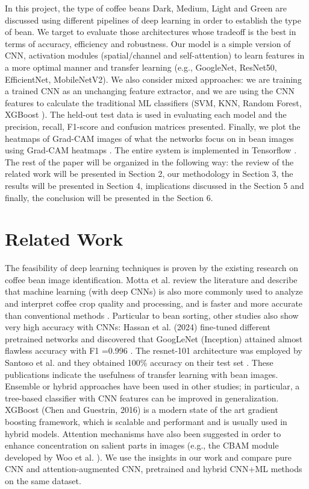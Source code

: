 \documentclass[conference]{IEEEtran}
\begin{document}
In this project, the type of coffee beans Dark, Medium, Light and Green are discussed using different pipelines of deep learning in order to establish the type of bean. We target to evaluate those architectures whose tradeoff is the best in terms of accuracy, efficiency and robustness. Our model is a simple version of CNN, activation modules (spatial/channel and self-attention) to learn features in a more optimal manner and transfer learning (e.g., GoogleNet, ResNet50, EfficientNet, MobileNetV2). We also consider mixed approaches: we are training a trained CNN as an unchanging feature extractor, and we are using the CNN features to calculate the traditional ML classifiers (SVM, KNN, Random Forest, XGBoost \cite{Chen2016}). The held-out test data is used in evaluating each model and the precision, recall, F1-score and confusion matrices presented. Finally, we plot the heatmaps of Grad-CAM images of what the networks focus on in bean images using Grad-CAM heatmaps \cite{Selvaraju2017}. The entire system is implemented in Tensorflow \cite{TensorFlow2016}. The rest of the paper will be organized in the following way: the review of the related work will be presented in Section 2, our methodology in Section 3, the results will be presented in Section 4, implications discussed in the Section 5 and finally, the conclusion will be presented in the Section 6.





\section{Related Work}
The feasibility of deep learning techniques is proven by the existing research on coffee bean image identification. Motta et al. review the literature and describe that machine learning (with deep CNNs) is also more commonly used to analyze and interpret coffee crop quality and processing, and is faster and more accurate than conventional methods \cite{Motta2025}. Particular to bean sorting, other studies also show very high accuracy with CNNs: Hassan et al. (2024) fine-tuned different pretrained networks and discovered that GoogLeNet (Inception) attained almost flawless accuracy with F1 =0.996 \cite{Hassan2024}. The resnet-101 architecture was employed by Santoso et al. and they obtained 100\% accuracy on their test set \cite{Santoso2025}. These publications indicate the usefulness of transfer learning with bean images. Ensemble or hybrid approaches have been used in other studies; in particular, a tree-based classifier with CNN features can be improved in generalization. XGBoost (Chen and Guestrin, 2016) is a modern state of the art gradient boosting framework, which is scalable and performant \cite{Chen2016} and is usually used in hybrid models. Attention mechanisms have also been suggested in order to enhance concentration on salient parts in images (e.g., the CBAM module developed by Woo et al. \cite{Woo2018}). We use the insights in our work and compare pure CNN and attention-augmented CNN, pretrained and hybrid CNN+ML methods on the same dataset.
\end{document}

